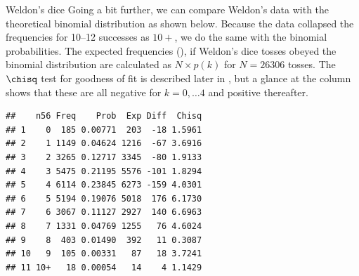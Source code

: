 \documentclass[11pt]{book}
\renewenvironment{knitrout}{\small\renewcommand{\baselinestretch}{.85}}{} %
\begin{document}
\begin{Example}[dice2]{Weldon's dice}
Going a bit further, we can compare Weldon's data with the 
theoretical binomial distribution as shown below. Because the
 data collapsed the frequencies for 10--12
successes as $10+$,
we do the same with the binomial probabilities.
The expected frequencies (), if Weldon's dice tosses obeyed
the binomial distribution are calculated as $N \times p(k)$ for
$N=26306$ tosses.  The $\chisq$ test for goodness of fit
is described later in , but a glance
at the  column shows that these are all negative for
$k=0, \dots 4$ and positive thereafter.

\begin{knitrout}
\color{fgcolor}\begin{kframe}
\begin{alltt}
 \hlkwb{<-}    

 \hlkwb{<-} \hlstd{(}\hlstd{,} \hlstd{)}
 \hlkwb{<-}  \hlstd{,} \hlopt{/}\hlstd{)}               
 \hlkwb{<-} \hlstd{(Prob[}\hlopt{:}\hlstd{],} \hlstd{(Prob[}\hlopt{:}\hlstd{]))}  
\hlkwb{=} \hlstd{(}\hlopt{*}                   
 \hlkwb{=} \hlstd{Weldon.df[,}\hlstd{]} \hlopt{-}           
 \hlkwb{=} \hlopt{^} \hlopt{/}
 \hlstd{=}
\end{alltt}
\begin{verbatim}
##    n56 Freq    Prob  Exp Diff  Chisq
## 1    0  185 0.00771  203  -18 1.5961
## 2    1 1149 0.04624 1216  -67 3.6916
## 3    2 3265 0.12717 3345  -80 1.9133
## 4    3 5475 0.21195 5576 -101 1.8294
## 5    4 6114 0.23845 6273 -159 4.0301
## 6    5 5194 0.19076 5018  176 6.1730
## 7    6 3067 0.11127 2927  140 6.6963
## 8    7 1331 0.04769 1255   76 4.6024
## 9    8  403 0.01490  392   11 0.3087
## 10   9  105 0.00331   87   18 3.7241
## 11 10+   18 0.00054   14    4 1.1429
\end{verbatim}
\end{kframe}
\end{knitrout}
\end{Example}
\end{document}
